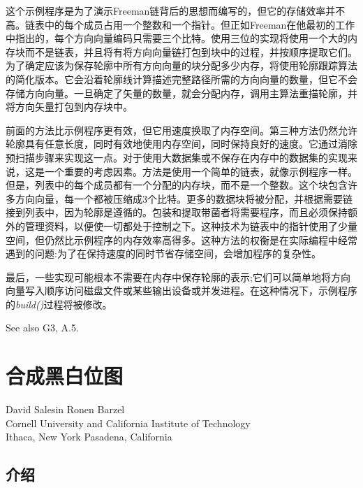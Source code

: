 \begin{CJK}{UTF8}{gbsn}
这个示例程序是为了演示Freeman链背后的思想而编写的，但它的存储效率并不高。链表中的每个成员占用一个整数和一个指针。但正如Freeman在他最初的工作中指出的，每个方向向量编码只需要三个比特。使用三位的实现将使用一个大的内存块而不是链表，并且将有将方向向量链打包到块中的过程，并按顺序提取它们。为了确定应该为保存轮廓中所有方向向量的块分配多少内存，将使用轮廓跟踪算法的简化版本。它会沿着轮廓线计算描述完整路径所需的方向向量的数量，但它不会存储方向向量。一旦确定了矢量的数量，就会分配内存，调用主算法重描轮廓，并将方向矢量打包到内存块中。

前面的方法比示例程序更有效，但它用速度换取了内存空间。第三种方法仍然允许轮廓具有任意长度，同时有效地使用内存空间，同时保持良好的速度。它通过消除预扫描步骤来实现这一点。对于使用大数据集或不保存在内存中的数据集的实现来说，这是一个重要的考虑因素。方法是使用一个简单的链表，就像示例程序一样。但是，列表中的每个成员都有一个分配的内存块，而不是一个整数。这个块包含许多方向向量，每一个都被压缩成3个比特。更多的数据块将被分配，并根据需要链接到列表中，因为轮廓是遵循的。包装和提取带菌者将需要程序，而且必须保持额外的管理资料，以便使一切都处于控制之下。这种技术为链表中的指针使用了少量空间，但仍然比示例程序的内存效率高得多。这种方法的权衡是在实际编程中经常遇到的问题:为了在保持速度的同时节省存储空间，会增加程序的复杂性。

最后，一些实现可能根本不需要在内存中保存轮廓的表示;它们可以简单地将方向向量写入顺序访问磁盘文件或某些输出设备或并发进程。在这种情况下，示例程序的\textit{build()}过程将被修改。

See also G3, A.5.

\newpage
\section{合成黑白位图}
\begin{center}
\small{
David Salesin   \hspace{25ex}                 Ronen Barzel\\
\hspace{10ex} Cornell University    \hspace{5ex}        and  \hspace{3ex}   California Institute of Technology\\
\hspace{3ex} Ithaca, New York           \hspace{20ex}           Pasadena, California}
\end{center}

\subsection*{介绍}


\end{CJK}
